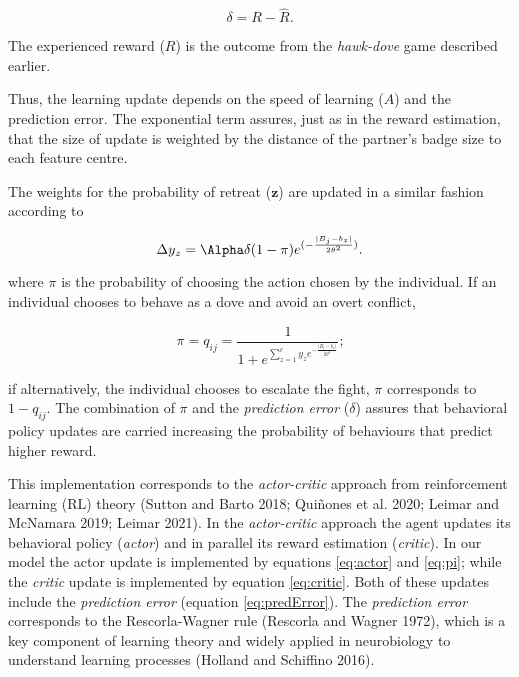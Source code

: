 \documentclass[
  12pt,
]{article}
\begin{document}
\begin{equation}
  \delta = R - \hat{R} \textrm{.} \label{eq:predError}
\end{equation}

The experienced reward (\(R\)) is the outcome from the \emph{hawk-dove}
game described earlier.

Thus, the learning update depends on the speed of learning (\(A\)) and
the prediction error. The exponential term assures, just as in the
reward estimation, that the size of update is weighted by the distance
of the partner's badge size to each feature centre.

The weights for the probability of retreat (\(\symbf{z}\)) are updated
in a similar fashion according to

\begin{equation}
  \Delta y_z = \Alpha \delta (1-\pi) e^{(-\frac{|B_j-b_z|}{2\theta^2})} \textrm{.}
  \label{eq:actor}
\end{equation}

where \(\pi\) is the probability of choosing the action chosen by the
individual. If an individual chooses to behave as a dove and avoid an
overt conflict,

\begin{equation}
  \pi = q_{ij} = \frac{1}{1+e^{\sum_{z=1}^{c} y_z e^{-\frac{|B_i-b_z|}{2\theta^2}}}} \textrm{;}\label{eq:pi}
\end{equation}

if alternatively, the individual chooses to escalate the fight, \(\pi\)
corresponds to \(1-q_{ij}\). The combination of \(\pi\) and the
\emph{prediction error} (\(\delta\)) assures that behavioral policy
updates are carried increasing the probability of behaviours that
predict higher reward.

This implementation corresponds to the \emph{actor-critic} approach from
reinforcement learning (RL) theory (Sutton and Barto 2018; Quiñones et
al. 2020; Leimar and McNamara 2019; Leimar 2021). In the
\emph{actor-critic} approach the agent updates its behavioral policy
(\emph{actor}) and in parallel its reward estimation (\emph{critic}). In
our model the actor update is implemented by equations \ref{eq:actor}
and \ref{eq:pi}; while the \emph{critic} update is implemented by
equation \ref{eq:critic}. Both of these updates include the
\emph{prediction error} (equation \ref{eq:predError}). The
\emph{prediction error} corresponds to the Rescorla-Wagner rule
(Rescorla and Wagner 1972), which is a key component of learning theory
and widely applied in neurobiology to understand learning processes
(Holland and Schiffino 2016).
\end{document}
